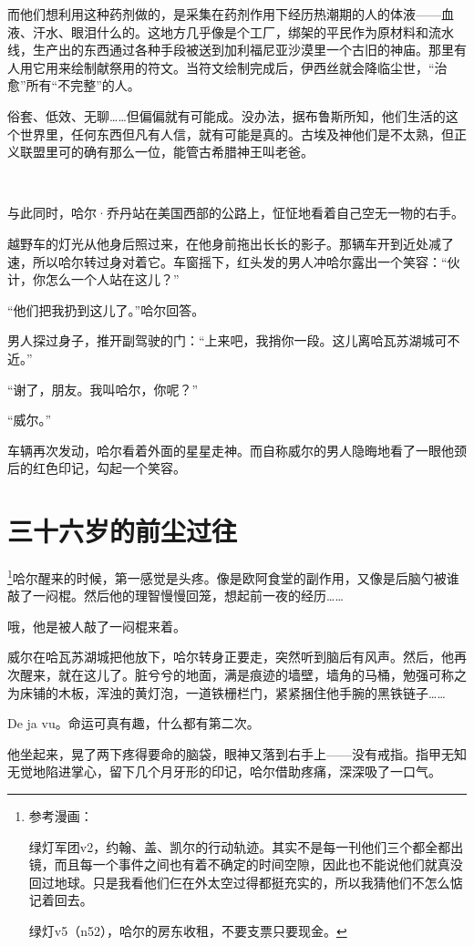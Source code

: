 \documentclass[../main]{subfiles}
\begin{document}
而他们想利用这种药剂做的，是采集在药剂作用下经历热潮期的人的体液——血液、汗水、眼泪什么的。这地方几乎像是个工厂，绑架的平民作为原材料和流水线，生产出的东西通过各种手段被送到加利福尼亚沙漠里一个古旧的神庙。那里有人用它用来绘制献祭用的符文。当符文绘制完成后，伊西丝就会降临尘世，“治愈”所有“不完整”的人。

俗套、低效、无聊……但偏偏就有可能成。没办法，据布鲁斯所知，他们生活的这个世界里，任何东西但凡有人信，就有可能是真的。古埃及神他们是不太熟，但正义联盟里可的确有那么一位，能管古希腊神王叫老爸。

~\

与此同时，哈尔·乔丹站在美国西部的公路上，怔怔地看着自己空无一物的右手。

越野车的灯光从他身后照过来，在他身前拖出长长的影子。那辆车开到近处减了速，所以哈尔转过身对着它。车窗摇下，红头发的男人冲哈尔露出一个笑容：“伙计，你怎么一个人站在这儿？”

“他们把我扔到这儿了。”哈尔回答。

男人探过身子，推开副驾驶的门：“上来吧，我捎你一段。这儿离哈瓦苏湖城可不近。”

“谢了，朋友。我叫哈尔，你呢？”

“威尔。”

车辆再次发动，哈尔看着外面的星星走神。而自称威尔的男人隐晦地看了一眼他颈后的红色印记，勾起一个笑容。

\section{三十六岁的前尘过往}

\footnote[1]{参考漫画：

    绿灯军团v2，约翰、盖、凯尔的行动轨迹。其实不是每一刊他们三个都全都出镜，而且每一个事件之间也有着不确定的时间空隙，因此也不能说他们就真没回过地球。只是我看他们仨在外太空过得都挺充实的，所以我猜他们不怎么惦记着回去。

    绿灯v5（n52），哈尔的房东收租，不要支票只要现金。}哈尔醒来的时候，第一感觉是头疼。像是欧阿食堂的副作用，又像是后脑勺被谁敲了一闷棍。然后他的理智慢慢回笼，想起前一夜的经历……

哦，他是被人敲了一闷棍来着。

威尔在哈瓦苏湖城把他放下，哈尔转身正要走，突然听到脑后有风声。然后，他再次醒来，就在这儿了。脏兮兮的地面，满是痕迹的墙壁，墙角的马桶，勉强可称之为床铺的木板，浑浊的黄灯泡，一道铁栅栏门，紧紧捆住他手腕的黑铁链子……

De ja vu。命运可真有趣，什么都有第二次。

他坐起来，晃了两下疼得要命的脑袋，眼神又落到右手上——没有戒指。指甲无知无觉地陷进掌心，留下几个月牙形的印记，哈尔借助疼痛，深深吸了一口气。
\end{document}
